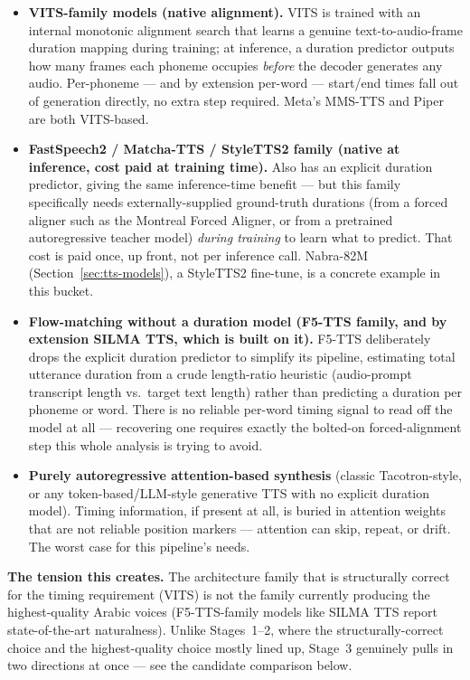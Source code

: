 \documentclass[11pt,a4paper]{article}
\begin{document}
\begin{itemize}[leftmargin=1.4em]
  \item \textbf{VITS-family models (native alignment).} VITS is trained with
  an internal monotonic alignment search that learns a genuine
  text-to-audio-frame duration mapping during training; at inference, a
  duration predictor outputs how many frames each phoneme occupies
  \emph{before} the decoder generates any audio. Per-phoneme --- and by
  extension per-word --- start/end times fall out of generation directly, no
  extra step required. Meta's MMS-TTS and Piper are both VITS-based.
  \item \textbf{FastSpeech2 / Matcha-TTS / StyleTTS2 family (native at
  inference, cost paid at training time).} Also has an explicit duration
  predictor, giving the same inference-time benefit --- but this family
  specifically needs externally-supplied ground-truth durations (from a
  forced aligner such as the Montreal Forced Aligner, or from a pretrained
  autoregressive teacher model) \emph{during training} to learn what to
  predict. That cost is paid once, up front, not per inference call. Nabra-82M
  (Section~\ref{sec:tts-models}), a StyleTTS2 fine-tune, is a concrete
  example in this bucket.
  \item \textbf{Flow-matching without a duration model (F5-TTS family, and
  by extension SILMA TTS, which is built on it).} F5-TTS deliberately drops
  the explicit duration predictor to simplify its pipeline, estimating total
  utterance duration from a crude length-ratio heuristic (audio-prompt
  transcript length vs.\ target text length) rather than predicting a
  duration per phoneme or word. There is no reliable per-word timing signal
  to read off the model at all --- recovering one requires exactly the
  bolted-on forced-alignment step this whole analysis is trying to avoid.
  \item \textbf{Purely autoregressive attention-based synthesis} (classic
  Tacotron-style, or any token-based/LLM-style generative TTS with no
  explicit duration model). Timing information, if present at all, is
  buried in attention weights that are not reliable position markers ---
  attention can skip, repeat, or drift. The worst case for this pipeline's
  needs.
\end{itemize}

\begin{noteb}
\textbf{The tension this creates.} The architecture family that is
structurally correct for the timing requirement (VITS) is not the family
currently producing the highest-quality Arabic voices (F5-TTS-family models
like SILMA TTS report state-of-the-art naturalness). Unlike Stages~1--2,
where the structurally-correct choice and the highest-quality choice mostly
lined up, Stage~3 genuinely pulls in two directions at once --- see the
candidate comparison below.
\end{noteb}
\end{document}
